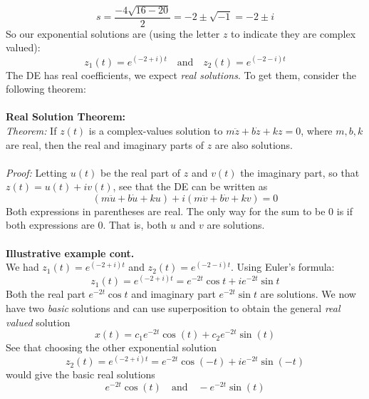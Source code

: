 \documentclass{report}
\begin{document}
\begin{equation*}
s=\frac{-4\sqrt{16-20}}{2}=-2\pm\sqrt{-1}=-2\pm i
\end{equation*}
So our exponential solutions are (using the letter $z$ to indicate they are complex valued):
\begin{equation*}
z_1(t)=e^{(-2+i)t}\quad\text{and}\quad z_2(t)=e^{(-2-i)t}
\end{equation*}
The DE has real coefficients, we expect \textit{real solutions}. To get them, consider the following theorem:\\
\vspace{1mm}\\
\textbf{Real Solution Theorem:}\\
\textit{Theorem:} If $z(t)$ is a complex-values solution to $m\ddot{z}+b\dot{z}+kz=0$, where $m,b,k$ are real, 
then the real and imaginary parts of $z$ are also solutions.\\
\vspace{1mm}\\
\textit{Proof:} Letting $u(t)$ be the real part of $z$ and $v(t)$ the imaginary part, so that
$z(t)=u(t)+iv(t)$, see that the DE can be written as
\begin{equation*}
(m\ddot{u}+b\dot{u}+ku)+i(m\ddot{v}+b\dot{v}+kv)=0
\end{equation*}
Both expressions in parentheses are real. The only way for the sum to be 0 is if both expressions are 0. 
That is, both $u$ and $v$ are solutions.\\
\vspace{1mm}\\
\textbf{Illustrative example cont.}\\
We had $z_1(t)=e^{(-2+i)t}$ and $z_2(t)=e^{(-2-i)t}$. Using Euler's formula:
\begin{equation*}
z_1(t)=e^{(-2+i)t}=e^{-2t}\cos t+ie^{-2t}\sin t
\end{equation*}
Both the real part $e^{-2t}\cos t$ and imaginary part $e^{-2t}\sin t$ are solutions. We now have two \textit{basic}
solutions and can use superposition to obtain the general
\textit{real valued} solution
\begin{equation*}
x(t)=c_1e^{-2t}\cos(t)+c_2e^{-2t}\sin(t)
\end{equation*}
See that choosing the other exponential solution
\begin{equation*}
z_2(t)=e^{(-2+i)t}=e^{-2t}\cos(-t)+ie^{-2t}\sin(-t)
\end{equation*}
would give the basic real solutions
\begin{equation*}
e^{-2t}\cos(t)\quad\text{and}\quad-e^{-2t}\sin(t)
\end{equation*}
\end{document}
